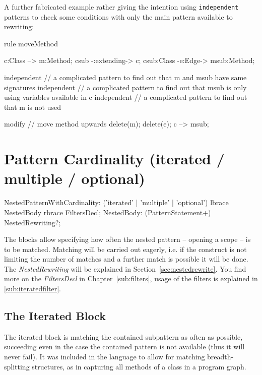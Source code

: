 \begin{example}
  A further fabricated example rather giving the intention using \texttt{independent} patterns to check some conditions with only the main pattern available to rewriting:

  \begin{grgen}
rule moveMethod
{
  c:Class --> m:Method;
  csub -:extending-> c;
  csub:Class -e:Edge-> msub:Method;
  
  independent {
    // a complicated pattern to find out that m and msub have same signatures
  }
  independent {
    // a complicated pattern to find out that msub is only using variables available in c
  }
  independent {
    // a complicated pattern to find out that m is not used
  }
 
  modify { // move method upwards
    delete(m);
    delete(e);
    c --> msub;
  }
}
  \end{grgen}
\end{example}

  
\section{Pattern Cardinality (iterated / multiple / optional)}
\label{cardinality}

\begin{rail}  
  NestedPatternWithCardinality: 
    ('iterated' | 'multiple' | 'optional') lbrace NestedBody rbrace FiltersDecl;
  NestedBody: (PatternStatement+) NestedRewriting?;
\end{rail}

The  blocks allow specifying how often the nested pattern -- opening a scope -- is to be matched.
Matching will be carried out eagerly, i.e. if the construct is not limiting the number of matches and a further match is possible it will be done.
The \emph{NestedRewriting} will be explained in Section~\ref{sec:nestedrewrite}.
You find more on the \emph{FiltersDecl} in Chapter~\ref{sub:filters}, usage of the filters is explained in \ref{sub:iteratedfilter}.

\subsection*{The Iterated Block} 
The iterated block is matching the contained subpattern as often as possible, succeeding even in the case the contained pattern is not available (thus it will never fail).
It was included in the language to allow for matching breadth-splitting structures, as in capturing all methods of a class in a program graph.

